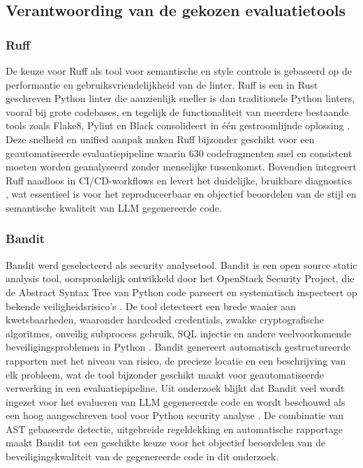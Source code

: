 \subsection{Verantwoording van de gekozen evaluatietools}

\subsubsection{Ruff}
De keuze voor Ruff als tool voor semantische en style controle is gebaseerd op de performantie en gebruiksvriendelijkheid van de linter. Ruff is een in Rust geschreven Python linter die aanzienlijk sneller is dan traditionele Python linters, vooral bij grote codebases, en tegelijk de functionaliteit van meerdere bestaande tools zoals Flake8, Pylint en Black consolideert in één gestroomlijnde oplossing \autocite{brtnik2025thesis}. Deze snelheid en unified aanpak maken Ruff bijzonder geschikt voor een geautomatiseerde evaluatiepipeline waarin 630 codefragmenten snel en consistent moeten worden geanalyseerd zonder menselijke tussenkomst. Bovendien integreert Ruff naadloos in CI/CD-workflows en levert het duidelijke, bruikbare diagnostics \autocite{brtnik2025thesis}, wat essentieel is voor het reproduceerbaar en objectief beoordelen van de stijl en semantische kwaliteit van LLM gegenereerde code.

\subsubsection{Bandit}
Bandit werd geselecteerd als security analysetool. Bandit is een open source static analysis tool, oorspronkelijk ontwikkeld door het OpenStack Security Project, die de Abstract Syntax Tree van Python code parseert en systematisch inspecteert op bekende veiligheidsrisico's \autocite{Alrashedy2025}. De tool detecteert een brede waaier aan kwetsbaarheden, waaronder hardcoded credentials, zwakke cryptografische algoritmes, onveilig subprocess gebruik, SQL injectie en andere veelvoorkomende beveiligingsproblemen in Python \autocite{Alrashedy2025}. Bandit genereert automatisch gestructureerde rapporten met het niveau van risico, de precieze locatie en een beschrijving van elk probleem, wat de tool bijzonder geschikt maakt voor geautomatiseerde verwerking in een evaluatiepipeline. Uit onderzoek blijkt dat Bandit veel wordt ingezet voor het evalueren van LLM gegenereerde code en wordt beschouwd als een hoog aangeschreven tool voor Python security analyse \autocite{Alrashedy2025}. De combinatie van AST gebaseerde detectie, uitgebreide regeldekking en automatische rapportage maakt Bandit tot een geschikte keuze voor het objectief beoordelen van de beveiligingskwaliteit van de gegenereerde code in dit onderzoek.

